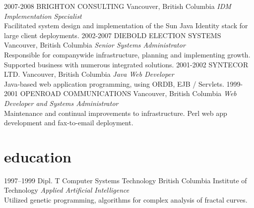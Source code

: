 \documentclass[]{friggeri-cv} %
\begin{document}
\begin{entrylist}
\entry
{2007-2008}
{BRIGHTON CONSULTING}
{Vancouver, British Columbia}
{\emph{IDM Implementation Specialist} \\
Facilitated system design and implementation of the Sun Java Identity stack for large client deployments.}
\entry
{2002-2007}
{DIEBOLD ELECTION SYSTEMS}
{Vancouver, British Columbia}
{\emph{Senior Systems Administrator} \\
Responsible for companywide infrastructure, planning and implementing growth. Supported business with numerous integrated solutions.}
\entry
{2001-2002}
{SYNTECOR LTD.}
{Vancouver, British Columbia}
{\emph{Java Web Developer} \\
Java-based web application programming, using ORDB, EJB / Servlets.}
\entry
{1999-2001}
{OPENROAD COMMUNICATIONS}
{Vancouver, British Columbia}
{\emph{Web Developer and Systems Administrator} \\
Maintenance and continual improvements to infrastructure. Perl web app development and fax-to-email deployment.}
\end{entrylist}


\section{education}

\begin{entrylist}
\entry
{1997--1999}
{Dipl. T {\normalfont Computer Systems Technology}}
{British Columbia Institute of Technology}
{\emph{Applied Artificial Intelligence} \\ Utilized genetic programming, algorithms for complex analysis of fractal curves.}
\end{entrylist}



\end{document}
